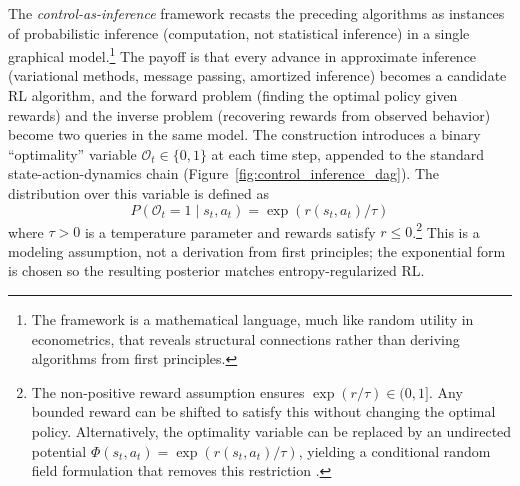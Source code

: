 The \emph{control-as-inference} framework \citep{Todorov2006, Kappen2011, Ziebart2010, Levine2018} recasts the preceding algorithms as instances of probabilistic inference (computation, not statistical inference) in a single graphical model.\footnote{The framework is a mathematical language, much like random utility in econometrics, that reveals structural connections rather than deriving algorithms from first principles.} The payoff is that every advance in approximate inference (variational methods, message passing, amortized inference) becomes a candidate RL algorithm, and the forward problem (finding the optimal policy given rewards) and the inverse problem (recovering rewards from observed behavior) become two queries in the same model. The construction introduces a binary ``optimality'' variable $\mathcal{O}_t \in \{0,1\}$ at each time step, appended to the standard state-action-dynamics chain (Figure~\ref{fig:control_inference_dag}). The distribution over this variable is defined as
\begin{equation}
P(\mathcal{O}_t = 1 \mid s_t, a_t) = \exp(r(s_t, a_t)/\tau)
\label{eq:optimality_variable}
\end{equation}
where $\tau > 0$ is a temperature parameter and rewards satisfy $r \leq 0$.\footnote{The non-positive reward assumption ensures $\exp(r/\tau) \in (0,1]$. Any bounded reward can be shifted to satisfy this without changing the optimal policy. Alternatively, the optimality variable can be replaced by an undirected potential $\Phi(s_t, a_t) = \exp(r(s_t,a_t)/\tau)$, yielding a conditional random field formulation that removes this restriction \citep{Ziebart2010}.} This is a modeling assumption, not a derivation from first principles; the exponential form is chosen so the resulting posterior matches entropy-regularized RL.

